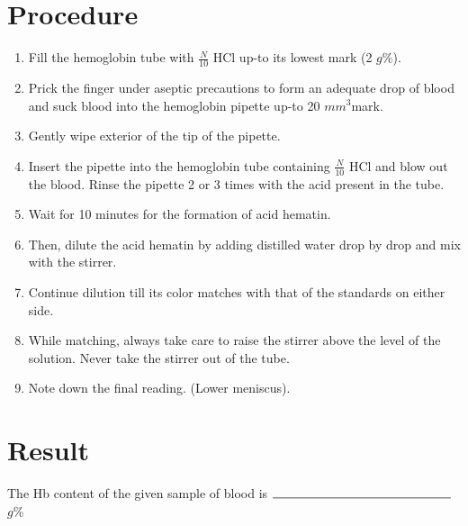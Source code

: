 \documentclass[a4paper,12pt,openany,twoside]{book}
\begin{document}
								\section*{Procedure}
								\begin{enumerate}
										\itemsep0em
									\item{Fill the hemoglobin tube with $\frac{N}{10}$ HCl up-to its lowest mark (2 $g$\%).}
									\item{Prick the finger under aseptic precautions to form an adequate drop of blood and suck blood into the hemoglobin pipette up-to 20 $mm^{3}$mark.}
									\item{Gently wipe exterior of the tip of the pipette.}
									\item{Insert the pipette into the hemoglobin tube containing $\frac{N}{10}$ HCl and blow out the blood. Rinse the pipette 2 or 3 times with the acid present in the tube.}
									\item{Wait for 10 minutes for the formation of acid hematin.}
									\item{Then, dilute the acid hematin by adding distilled water drop by drop and mix with the stirrer.}
									\item{Continue dilution till its color matches with that of the standards on either side.}
									\item{While matching, always take care to raise the stirrer above the level of the solution. Never take the stirrer out of the tube.}
									\item{Note down the final reading. (Lower meniscus).}
								\end{enumerate}
								\section*{Result}
								The Hb content of the given sample of blood is $\rule{5cm}{0.5pt}$ $g$\%
\end{document}

